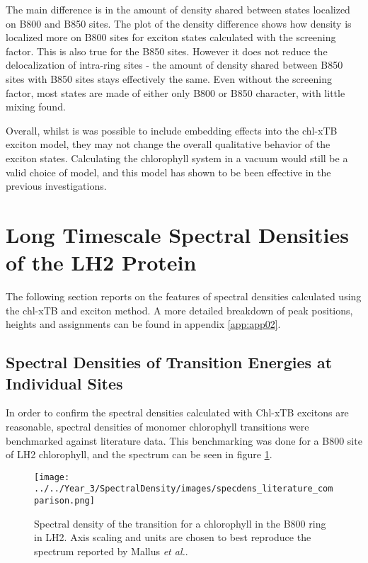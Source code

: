 The main difference is in the amount of density shared between states localized 
on B800 and B850 sites. The plot of the density difference shows how density is 
localized more on B800 sites for exciton states calculated with the screening
factor. This is also true for the B850 sites. However it does not reduce the delocalization
of intra-ring sites - the amount of density shared between B850 sites with B850 
sites stays effectively the same. Even without the screening factor, most states
are made of either only B800 or B850 character, with little mixing found.

Overall, whilst is was possible to include embedding effects into the chl-xTB exciton
model, they may not change the overall qualitative behavior of the exciton states.
Calculating the chlorophyll system in a vacuum would still be a valid choice of
model, and this model has shown to be been effective in the previous investigations.

\section{Long Timescale Spectral Densities of the LH2 Protein}
\label{sec:sites_states_couplings}

The following section reports on the features of spectral densities calculated using
the chl-xTB and exciton method. A more detailed breakdown of peak positions, heights
and assignments can be found in appendix \ref{app:app02}.

\subsection{Spectral Densities of \Qy Transition Energies at Individual Sites}
\label{subsec:sites}

In order to confirm the spectral densities calculated with Chl-xTB excitons are 
reasonable, spectral densities of monomer chlorophyll \Qy transitions were benchmarked 
against literature data. This benchmarking was done for a B800 site of LH2 chlorophyll,
and the spectrum can be seen in figure \ref{fig:specdens_lit}.

\begin{figure}
    \centering
    \texttt{[image: ../../Year\_3/SpectralDensity/images/specdens\_literature\_comparison.png]}
    \caption{Spectral density of the \Qy transition for a chlorophyll in the B800
    ring in LH2. Axis scaling and units are chosen to best reproduce the spectrum
    reported by Mallus \emph{et al.}\cite{Mallus2018}.}
    \label{fig:specdens_lit}
\end{figure}


